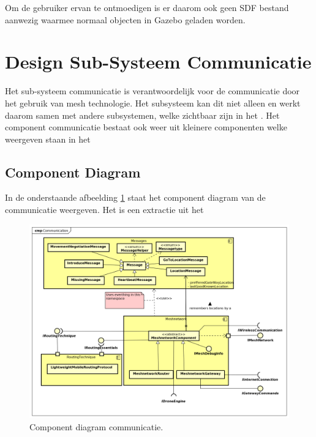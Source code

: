 \documentclass[a4paper, 11pt, oneside]{report}
\begin{document}
Om de gebruiker ervan te ontmoedigen is er daarom ook geen SDF bestand aanwezig waarmee normaal objecten in Gazebo geladen worden. 

\section{Design Sub-Systeem Communicatie}
Het sub-systeem communicatie is verantwoordelijk voor de communicatie door het gebruik van mesh technologie.
Het subsysteem kan dit niet alleen en werkt daarom samen met andere subsystemen, welke zichtbaar zijn in het  .
Het component communicatie bestaat ook weer uit kleinere componenten welke weergeven staan in het 
  
\label{DetailedDesign:Communicatie}
\subsection{Component Diagram}
\label{DetailedDesign:CommunicatieComponentDiagram}
In de onderstaande afbeelding \ref{fig:component:Communicatie} staat het component diagram van de communicatie weergeven.
Het is een extractie uit het  
\begin{figure}[H]
	\begin{center}\includegraphics[width=\linewidth]{Afbeeldingen/CommunicationComponentDiagram.png}\end{center}
	\caption{Component diagram communicatie.}
	\label{fig:component:Communicatie}
\end{figure}
\end{document}
